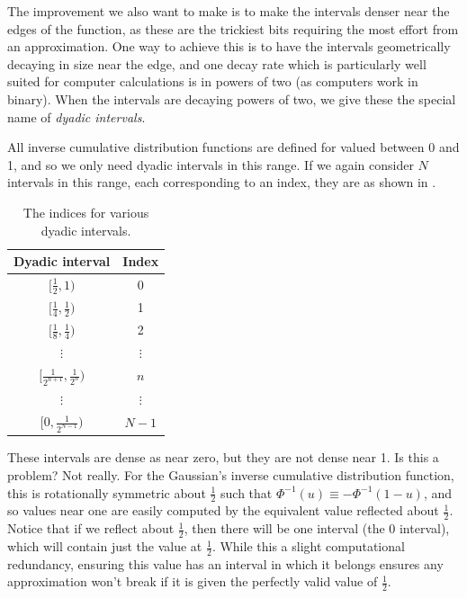 \documentclass[11pt,a4paper,twoside,english]{extarticle}
\begin{document}
The improvement we also want to make is to make the intervals denser near the edges of the function, as these are the trickiest bits requiring the most effort from an approximation. One way to achieve this is to have the intervals geometrically decaying in size near the edge, and one decay rate which is particularly well suited for computer calculations is in powers of two (as computers work in binary). When the intervals are decaying powers of two, we give these the special name of \emph{dyadic intervals}.

All inverse cumulative distribution functions are defined for valued between 0 and 1, and so we only need dyadic intervals in this range. If we again consider $ N $ intervals in this range, each corresponding to an index, they are as shown in .

\begin{table}[htb]
\centering
\begin{tabular}{cc}
Dyadic interval         & Index \\ \hline
$ [\tfrac{1}{2}, 1) $           &          0           \\
$ [\tfrac{1}{4}, \tfrac{1}{2}) $     &          1           \\
$ [\tfrac{1}{8}, \tfrac{1}{4}) $     &          2           \\
$ \vdots $                &      $ \vdots $      \\
$ [\tfrac{1}{2^{n+1}}, \tfrac{1}{2^n}) $ &        $ n $ \\
$ \vdots $                &      $ \vdots $      \\
$ [0, \tfrac{1}{2^{N-1}}) $ &        $ N-1 $
\end{tabular}
\caption{The indices for various dyadic intervals.}
\label{tab:dyadic_intervals_array_indices}
\end{table}

These intervals are dense as near zero, but they are not dense near 1. Is this a problem? Not really. For the Gaussian's inverse cumulative distribution function, this is rotationally symmetric about $ \tfrac{1}{2} $ such that $ \Phi^{-1}(u) \equiv -\Phi^{-1}(1-u) $, and so values near one are easily computed by the equivalent value reflected about $ \tfrac{1}{2} $. Notice that if we reflect about $ \tfrac{1}{2} $, then there will be one interval (the 0 interval), which will contain just the value at $ \tfrac{1}{2} $. While this a slight computational redundancy, ensuring this value has an interval in which it belongs ensures any approximation won't break if it is given the perfectly valid value of $ \tfrac{1}{2} $.
\end{document}

